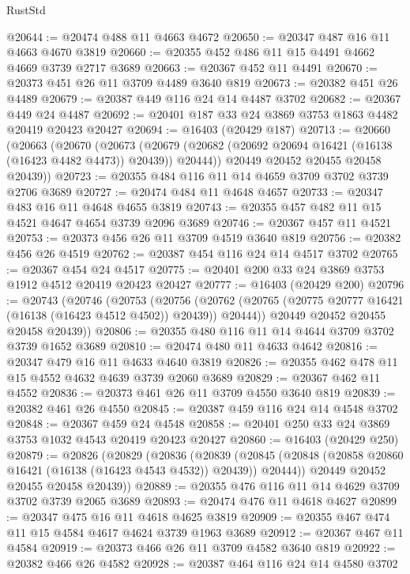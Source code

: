 \begin{lexlean}{RustStd}
\begin{coremodule}
@20644 := @20474 @488 @11 @4663 @4672
@20650 := @20347 @487 @16 @11 @4663 @4670 @3819
@20660 := @20355 @452 @486 @11 @15 @4491 @4662 @4669 @3739 @2717 @3689
@20663 := @20367 @452 @11 @4491
@20670 := @20373 @451 @26 @11 @3709 @4489 @3640 @819
@20673 := @20382 @451 @26 @4489
@20679 := @20387 @449 @116 @24 @14 @4487 @3702
@20682 := @20367 @449 @24 @4487
@20692 := @20401 @187 @33 @24 @3869 @3753 @1863 @4482 @20419 @20423 @20427
@20694 := @16403 (@20429 @187)
@20713 := @20660
    (@20663
      (@20670
        (@20673
          (@20679 (@20682 (@20692 @20694 @16421 (@16138 (@16423 @4482 @4473)) @20439)) @20444))
        @20449
        @20452
        @20455
        @20458
        @20439))
@20723 := @20355 @484 @116 @11 @14 @4659 @3709 @3702 @3739 @2706 @3689
@20727 := @20474 @484 @11 @4648 @4657
@20733 := @20347 @483 @16 @11 @4648 @4655 @3819
@20743 := @20355 @457 @482 @11 @15 @4521 @4647 @4654 @3739 @2096 @3689
@20746 := @20367 @457 @11 @4521
@20753 := @20373 @456 @26 @11 @3709 @4519 @3640 @819
@20756 := @20382 @456 @26 @4519
@20762 := @20387 @454 @116 @24 @14 @4517 @3702
@20765 := @20367 @454 @24 @4517
@20775 := @20401 @200 @33 @24 @3869 @3753 @1912 @4512 @20419 @20423 @20427
@20777 := @16403 (@20429 @200)
@20796 := @20743
    (@20746
      (@20753
        (@20756
          (@20762 (@20765 (@20775 @20777 @16421 (@16138 (@16423 @4512 @4502)) @20439)) @20444))
        @20449
        @20452
        @20455
        @20458
        @20439))
@20806 := @20355 @480 @116 @11 @14 @4644 @3709 @3702 @3739 @1652 @3689
@20810 := @20474 @480 @11 @4633 @4642
@20816 := @20347 @479 @16 @11 @4633 @4640 @3819
@20826 := @20355 @462 @478 @11 @15 @4552 @4632 @4639 @3739 @2060 @3689
@20829 := @20367 @462 @11 @4552
@20836 := @20373 @461 @26 @11 @3709 @4550 @3640 @819
@20839 := @20382 @461 @26 @4550
@20845 := @20387 @459 @116 @24 @14 @4548 @3702
@20848 := @20367 @459 @24 @4548
@20858 := @20401 @250 @33 @24 @3869 @3753 @1032 @4543 @20419 @20423 @20427
@20860 := @16403 (@20429 @250)
@20879 := @20826
    (@20829
      (@20836
        (@20839
          (@20845 (@20848 (@20858 @20860 @16421 (@16138 (@16423 @4543 @4532)) @20439)) @20444))
        @20449
        @20452
        @20455
        @20458
        @20439))
@20889 := @20355 @476 @116 @11 @14 @4629 @3709 @3702 @3739 @2065 @3689
@20893 := @20474 @476 @11 @4618 @4627
@20899 := @20347 @475 @16 @11 @4618 @4625 @3819
@20909 := @20355 @467 @474 @11 @15 @4584 @4617 @4624 @3739 @1963 @3689
@20912 := @20367 @467 @11 @4584
@20919 := @20373 @466 @26 @11 @3709 @4582 @3640 @819
@20922 := @20382 @466 @26 @4582
@20928 := @20387 @464 @116 @24 @14 @4580 @3702

\end{coremodule}
\end{lexlean}
